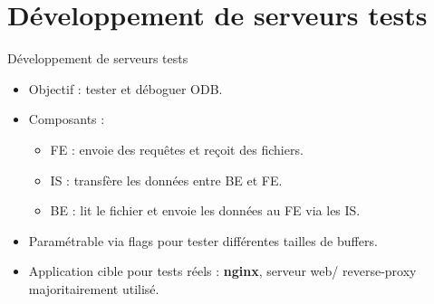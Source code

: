 \documentclass[aspectratio=43,8pt]{beamer}
\begin{document}
\section{Développement de serveurs tests}
\begin{frame}{Développement de serveurs tests}
\begin{itemize}
    \item Objectif : tester et déboguer ODB.
    \item Composants :
    \begin{itemize}
        \item FE : envoie des requêtes et reçoit des fichiers.
        \item IS : transfère les données entre BE et FE.
        \item BE : lit le fichier et envoie les données au FE via les IS.
    \end{itemize}
    \item Paramétrable via flags pour tester différentes tailles de buffers.
    \item Application cible pour tests réels : \textbf{nginx}, serveur web/ reverse-proxy majoritairement utilisé.
\end{itemize}
\end{frame}
\end{document}
